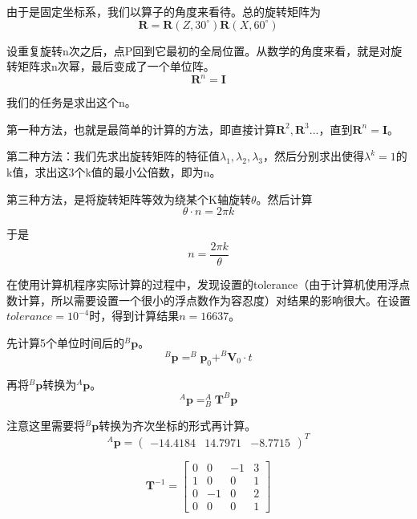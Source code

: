 \documentclass{homework}
\begin{document}
\begin{sol}
  由于是固定坐标系，我们以算子的角度来看待。总的旋转矩阵为
  \[
    \mathbf{R} = \mathbf{R}(Z,30^\circ) \mathbf{R}(X,60^\circ)
  \]

  设重复旋转n次之后，点P回到它最初的全局位置。从数学的角度来看，就是对旋转矩阵求n次幂，最后变成了一个单位阵。
  \[
    \mathbf{R}^n = \mathbf{I}
  \]

  我们的任务是求出这个n。
  
  第一种方法，也就是最简单的计算的方法，即直接计算$ \mathbf{R}^2, \mathbf{R}^3 ... $，直到$ \mathbf{R}^n = \mathbf{I} $。

  第二种方法：我们先求出旋转矩阵的特征值$ \lambda_1, \lambda_2, \lambda_3 $，然后分别求出使得$ \lambda^k = 1 $的k值，求出这3个k值的最小公倍数，即为n。

  第三种方法，是将旋转矩阵等效为绕某个K轴旋转$\theta$。然后计算
  \[
    \theta \cdot n = 2 \pi k
  \]

  于是
  \[
    n = \frac{2 \pi k}{\theta}
  \]

  在使用计算机程序实际计算的过程中，发现设置的tolerance（由于计算机使用浮点数计算，所以需要设置一个很小的浮点数作为容忍度）对结果的影响很大。在设置$ tolerance = 10^{-4} $时，得到计算结果$ n = 16637 $。
  
\end{sol}

\question 

\begin{sol}
  先计算5个单位时间后的$ ^B\mathbf{p} $。
  \[
    ^B\mathbf{p} = ^B\mathbf{p}_0 + ^B\mathbf{V}_0 \cdot t
  \]

  再将$ ^B\mathbf{p} $转换为$ ^A\mathbf{p} $。
  \[
    ^A\mathbf{p} = _B^A\mathbf{T} ^B\mathbf{p}
  \]

  注意这里需要将$ ^B\mathbf{p} $转换为齐次坐标的形式再计算。
  \[
    ^A\mathbf{p} = \begin{pmatrix} -14.4184 & 14.7971 & -8.7715 \end{pmatrix}^T
  \]
  
\end{sol}

\question 

\begin{sol}
  \[
    \mathbf{T}^{-1} =
    \begin{bmatrix}
      0 & 0 & -1 & 3 \\
      1 & 0 & 0 & 1 \\
      0 & -1 & 0 & 2 \\
      0 & 0 & 0 & 1
    \end{bmatrix}
  \]
  
\end{sol}
\end{document}
